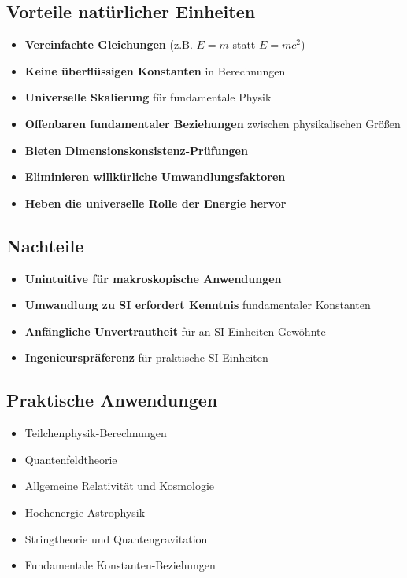 	\subsection{Vorteile natürlicher Einheiten}
	\begin{itemize}
		\item \textbf{Vereinfachte Gleichungen} (z.B. $E = m$ statt $E = mc^2$)
		\item \textbf{Keine überflüssigen Konstanten} in Berechnungen
		\item \textbf{Universelle Skalierung} für fundamentale Physik
		\item \textbf{Offenbaren fundamentaler Beziehungen} zwischen physikalischen Größen
		\item \textbf{Bieten Dimensionskonsistenz-Prüfungen}
		\item \textbf{Eliminieren willkürliche Umwandlungsfaktoren}
		\item \textbf{Heben die universelle Rolle der Energie hervor}
	\end{itemize}
	
	\subsection{Nachteile}
	\begin{itemize}
		\item \textbf{Unintuitive für makroskopische Anwendungen}
		\item \textbf{Umwandlung zu SI erfordert Kenntnis} fundamentaler Konstanten
		\item \textbf{Anfängliche Unvertrautheit} für an SI-Einheiten Gewöhnte
		\item \textbf{Ingenieurspräferenz} für praktische SI-Einheiten
	\end{itemize}
	
	\subsection{Praktische Anwendungen}
	\begin{itemize}
		\item Teilchenphysik-Berechnungen
		\item Quantenfeldtheorie
		\item Allgemeine Relativität und Kosmologie
		\item Hochenergie-Astrophysik
		\item Stringtheorie und Quantengravitation
		\item Fundamentale Konstanten-Beziehungen
	\end{itemize}
	
